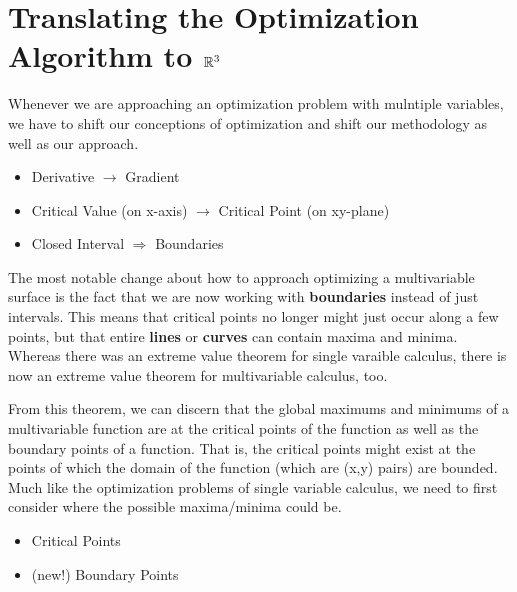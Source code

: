 \documentclass{report}
\begin{document}
\begin{sloppypar}
\section{Translating the Optimization Algorithm to
  $\mathbb{R}^{3}$}
Whenever we are approaching an optimization problem
with mulntiple variables, we have to shift our
conceptions of optimization and shift our
methodology as well as our approach.
\begin{itemize}
  \item Derivative $\rightarrow$ Gradient
  \item Critical Value (on x-axis) $\rightarrow$
        Critical Point (on xy-plane)
  \item Closed Interval $\Rightarrow$ Boundaries

\end{itemize}

The most notable change about how to approach
optimizing a multivariable surface is the fact
that we are now working with \textbf{boundaries} instead
of just intervals. This means that critical points
no longer might just occur along a few points, but
that entire \textbf{lines} or \textbf{curves}
can contain maxima and minima. Whereas there
was an extreme value theorem for single varaible
calculus, there is now an extreme value theorem
for multivariable calculus, too.

From this theorem, we can discern that
the global maximums and minimums of a multivariable
function are at the critical points of the function
as well as the boundary points of a function. That
is, the critical points might exist at the
points of which the domain of the function (which
are (x,y) pairs) are bounded.
\newpage
{}
Much like the optimization problems of
single variable calculus, we need to first consider
where the possible maxima/minima could be.
\begin{itemize}
  \item Critical Points
  \item (new!) Boundary Points


\end{itemize}
\end{sloppypar}
\end{document}
